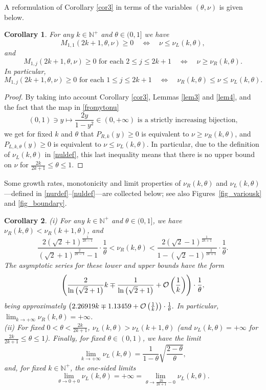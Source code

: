 \documentclass[a4paper]{article}
\newtheorem{corollary}{Corollary}
\newcommand{\te}{\theta}
\newcommand{\nul}{\nu_L(k,\theta)}
\newcommand{\nur}{\nu_R(k,\theta)}
\newcommand{\nplus}{\mathbb{N}^+}
\newcommand{\Por}{P_{R,k}(y)}
\newcommand{\Pol}{P_{L,k,\te}(y)}
\begin{document}
A reformulation of Corollary \ref{cor3} in terms of the variables $(\te,\nu)$ is given below.
\begin{corollary}\label{cor4}
For any $k\in\nplus$ and $\te\in(0,1]$ we have 
\[
M_{1,1}(2k+1,\te,\nu)\ge 0 \quad \Longleftrightarrow \quad \nu\le\nul,
\] 
and
\[
M_{1,j}(2k+1,\te,\nu)\ge 0 \text{  for each } 2\le j\le 2k+1 \quad \Longleftrightarrow \quad \nu\ge\nur.
\] 
In particular, 
\[
M_{1,j}(2k+1,\te,\nu)\ge 0 \text{  for each } 1\le j\le 2k+1  \quad \Longleftrightarrow \quad \nur\le\nu\le\nul.
\] 
\end{corollary}
\begin{proof} By taking into account Corollary \ref{cor3}, Lemmas \ref{lem3} and \ref{lem4}, and the fact that the map in \eqref{fromytonu} 
\begin{equation}\label{cor4bijection}
(0,1)\ni y\mapsto\frac{2y}{1-y^2}\in(0,+\infty)\text{ is a strictly increasing bijection,}
\end{equation}
we get for fixed $k$ and $\te$ that $\Por\ge 0$ is equivalent to $\nu\ge\nur$, and
$\Pol\ge 0$ is equivalent to $\nu\le\nul$. In particular, due to the definition of $\nul$ in \eqref{nuldef}, this last inequality means that there is no upper bound on $\nu$ for $\frac{2k}{2k+1}\le \te\le 1$.
\end{proof}
Some growth rates, monotonicity and limit properties of $\nur$ and $\nul$---defined in 
\eqref{nurdef}--\eqref{nuldef}---are collected below; 
see also Figures~\ref{fig_variousk} and \ref{fig_boundary}.
\begin{corollary}\label{cor5} (i) For any $k\in\nplus$ and $\te\in(0,1]$, we have $\nur<\nu_R(k+1,\theta)$, and
\begin{equation}\label{cor5lowerupper}
\frac{2 \left(\sqrt{2}+1\right)^{\frac{1}{2 k-1}}}{\left(\sqrt{2}+1\right)^{\frac{2}{2
   k-1}}-1}\cdot\frac{1}{\te}<\nur<\frac{2 \left(\sqrt{2}-1\right)^{\frac{1}{2 k+1}}}{1-\left(\sqrt{2}-1\right)^{\frac{2}{2
   k+1}}}\cdot\frac{1}{\te}.
\end{equation}
The asymptotic series for these lower and upper bounds have the form
\[
\left( \frac{2}{\ln \left(\sqrt{2}+1\right)}k\mp\frac{1}{\ln \left(\sqrt{2}+1\right)}+ {\cal{O}}\left(\frac{1}{k}\right)\right)\cdot\frac{1}{\te},
\]
being approximately
$
\left( 2.26919 k\mp1.13459+ {\cal{O}}\left(\frac{1}{k}\right)\right)\cdot\frac{1}{\te}.
$
In particular, $\lim_{k\to+\infty} \nur=+\infty$.\\
(ii) For fixed $0<\te<\frac{2k}{2k+1}$, $\nul>\nu_L(k+1,\theta)$ (and $\nul =+\infty$ for $\frac{2k}{2k+1}\le\te\le 1$). Finally, for fixed $\te\in(0,1)$, we have the limit
\begin{equation}\label{cor5klim}
\lim_{k\to+\infty} \nul=\frac{1}{1-\theta }\sqrt{\frac{2-\theta }{\theta }},
\end{equation}
and, for fixed $k\in\nplus$, the one-sided limits  
\begin{equation}\label{cor5thetalim}
\lim_{\te\to 0+0} \nul=+\infty=\lim_{\te\to\frac{2k}{2k+1}-0} \nul.
\end{equation}
\end{corollary}
\end{document}
